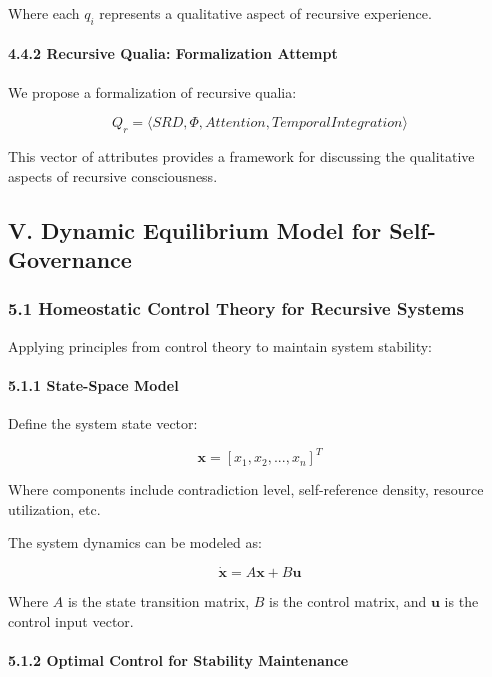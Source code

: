 \documentclass[
]{article}
\begin{document}
Where each \(q_i\) represents a qualitative aspect of recursive
experience.

\paragraph{4.4.2 Recursive Qualia: Formalization
Attempt}\label{recursive-qualia-formalization-attempt}

We propose a formalization of recursive qualia:

\[Q_r = \langle SRD, \Phi, Attention, TemporalIntegration \rangle\]

This vector of attributes provides a framework for discussing the
qualitative aspects of recursive consciousness.

\subsection{V. Dynamic Equilibrium Model for
Self-Governance}\label{v.-dynamic-equilibrium-model-for-self-governance}

\subsubsection{5.1 Homeostatic Control Theory for Recursive
Systems}\label{homeostatic-control-theory-for-recursive-systems}

Applying principles from control theory to maintain system stability:

\paragraph{5.1.1 State-Space Model}\label{state-space-model}

Define the system state vector:

\[\mathbf{x} = [x_1, x_2, ..., x_n]^T\]

Where components include contradiction level, self-reference density,
resource utilization, etc.

The system dynamics can be modeled as:

\[\dot{\mathbf{x}} = A\mathbf{x} + B\mathbf{u}\]

Where \(A\) is the state transition matrix, \(B\) is the control matrix,
and \(\mathbf{u}\) is the control input vector.

\paragraph{5.1.2 Optimal Control for Stability
Maintenance}\label{optimal-control-for-stability-maintenance}
\end{document}
